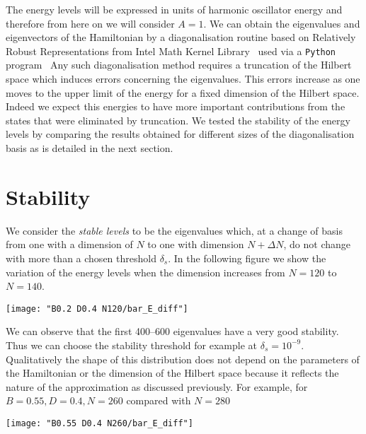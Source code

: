 \documentclass[../thesis.tex]{subfiles}
\begin{document}
The energy levels will be expressed in units of harmonic oscillator energy and therefore
from here on we will consider \(A = 1\).
We can obtain the eigenvalues and eigenvectors of the Hamiltonian by a
diagonalisation routine based on Relatively Robust Representations from
Intel\textsuperscript{\textregistered} Math Kernel Library~\cite{intel-mkl} used via a \texttt{Python}
program~\cite{NumPy-SciPy, scipy, matplotlib}%
Any such diagonalisation method requires a truncation of the Hilbert space
which induces errors concerning the eigenvalues. This errors increase as one moves to
the upper limit of the energy for a fixed dimension of the Hilbert space. Indeed we
expect this energies to have more important contributions from the states that were
eliminated by truncation.
We tested the stability of the energy levels by comparing the results obtained for
different sizes of the diagonalisation basis as is detailed in the next section.

\clearpage

\section{Stability}

We consider the \emph{stable levels} to be the eigenvalues which, at a change of
basis from one with a dimension of $N$ to one with dimension \(N+ \Delta N\),
do not change with more than a chosen threshold \(\delta_s\).
In the following figure we show the variation of the energy levels when
the dimension increases from \(N = 120\) to \(N = 140\).

\begin{center}
  \texttt{[image: "B0.2 D0.4 N120/bar\_E\_diff"]}
\end{center}

We can observe that the first 400--600 eigenvalues have a very good stability.
Thus we can choose the stability threshold for example at \(\delta_s = 10^{-9}\).
Qualitatively the shape of this distribution does not depend on the parameters of
the Hamiltonian or the dimension of the Hilbert space because it reflects the nature
of the approximation as discussed previously.
For example, for \(B = 0.55, D = 0.4, N = 260\) compared
with \(N = 280\)

\begin{center}
  \texttt{[image: "B0.55 D0.4 N260/bar\_E\_diff"]}
\end{center}
\end{document}
